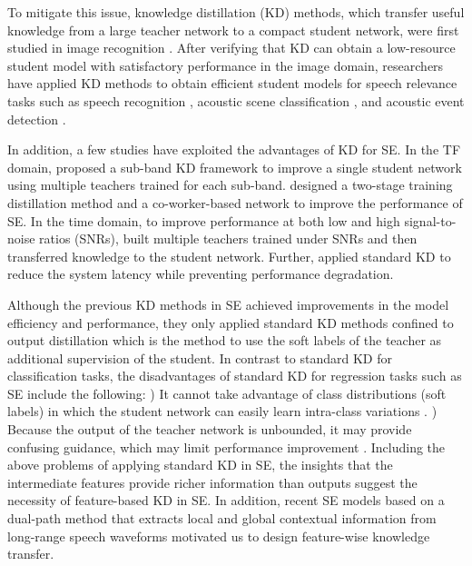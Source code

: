 \documentclass[a4paper]{article}
\begin{document}
To mitigate this issue, knowledge distillation (KD) methods, which transfer useful knowledge from a large teacher network to a compact student network, were first studied in image recognition \cite{hinton2015distilling, romero2014fitnets, zagoruyko2016paying,kim2018paraphrasing}. After verifying that KD can obtain a low-resource student model with satisfactory performance in the image domain, researchers have applied KD methods to obtain efficient student models for speech relevance tasks such as speech recognition \cite{chebotar2016distilling,lu2017knowledge,kurata2020knowledge}, acoustic scene classification \cite{heo2019acoustic,jung2020knowledge}, and acoustic event detection \cite{shi2019compression,shi2019semi}.

In addition, a few studies have exploited the advantages of KD for SE. In the TF domain, \cite{hao2020sub} proposed a sub-band KD framework to improve a single student network using multiple teachers trained for each sub-band. \cite{chen2021light} designed a two-stage training distillation method and a co-worker-based network to improve the performance of SE. In the time domain, to improve performance at both low and high signal-to-noise ratios (SNRs), \cite{hao2020snr} built multiple teachers trained under SNRs and then transferred knowledge to the student network. Further, \cite{nakaoka2021teacher} applied standard KD \cite{hinton2015distilling} to reduce the system latency while preventing performance degradation.

Although the previous KD methods in SE achieved improvements in the model efficiency and performance, they only applied standard KD methods confined to output distillation which is the method to use the soft labels of the teacher as additional supervision of the student. In contrast to standard KD for classification tasks, the disadvantages of standard KD for regression tasks such as SE include the following: \lowercase\expandafter{}) It cannot take advantage of class distributions (soft labels) in which the student network can easily learn intra-class variations \cite{hinton2015distilling}. \lowercase\expandafter{}) Because the output of the teacher network is unbounded, it may provide confusing guidance, which may limit performance improvement \cite{kang2021data}. Including the above problems of applying standard KD in SE, the insights that the intermediate features provide richer information than outputs \cite{romero2014fitnets, kim2018paraphrasing, tung2019similarity} suggest the necessity of feature-based KD in SE. In addition, recent SE models \cite{park2022manner,wang2021tstnn, pandey2020dual} based on a dual-path method that extracts local and global contextual information from long-range speech waveforms motivated us to design feature-wise knowledge transfer.
\end{document}
